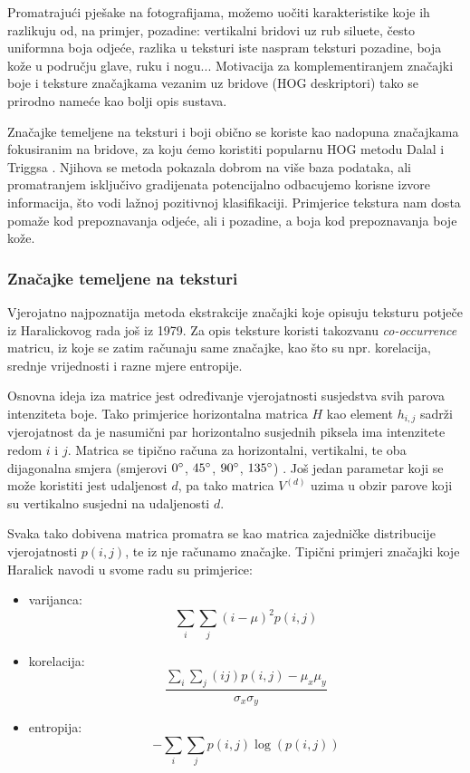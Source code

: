 \documentclass[seminar]{fer}
\begin{document}
Promatrajući pješake na fotografijama, možemo uočiti karakteristike koje ih razlikuju od, na primjer, pozadine: vertikalni bridovi uz rub siluete, često uniformna boja odjeće, razlika u teksturi iste naspram teksturi pozadine, boja kože u području glave, ruku i nogu...  Motivacija za komplementiranjem značajki boje i teksture značajkama vezanim uz bridove (HOG deskriptori) tako se prirodno nameće kao bolji opis sustava. 

Značajke temeljene na teksturi i boji obično se koriste kao nadopuna značajkama fokusiranim na bridove, za koju ćemo koristiti popularnu HOG
metodu Dalal i Triggsa \cite{HOG}. Njihova se metoda pokazala dobrom na više baza podataka, ali promatranjem isključivo gradijenata potencijalno odbacujemo
korisne izvore informacija, što vodi lažnoj pozitivnoj klasifikaciji. Primjerice tekstura nam dosta pomaže kod prepoznavanja odjeće, ali i pozadine, a boja kod prepoznavanja boje kože.

\subsubsection{Značajke temeljene na teksturi}
Vjerojatno najpoznatija metoda ekstrakcije značajki koje opisuju teksturu potječe iz Haralickovog rada \cite{Haralick} još iz 1979. Za opis teksture koristi takozvanu \emph{co-occurrence} matricu, iz koje se zatim računaju same značajke, kao što su npr. korelacija, srednje vrijednosti i razne mjere entropije.

Osnovna ideja iza matrice jest određivanje vjerojatnosti susjedstva svih parova intenziteta boje. Tako primjerice horizontalna matrica $H$ kao element
$h_{i,j}$ sadrži vjerojatnost da je nasumični par horizontalno susjednih piksela ima intenzitete redom $i$ i $j$. Matrica se tipično računa za horizontalni, vertikalni, te oba dijagonalna smjera (smjerovi $0\degree$, $45\degree$, $90\degree$, $135\degree$) . Još jedan parametar koji se može koristiti jest udaljenost $d$, pa tako matrica $V^{(d)}$ uzima u obzir 
parove koji su vertikalno susjedni na udaljenosti $d$.

Svaka tako dobivena matrica promatra se kao matrica zajedničke distribucije vjerojatnosti $p(i, j)$, te iz nje računamo značajke. Tipični primjeri značajki koje Haralick navodi u svome radu su primjerice:

\begin{itemize}
  \item
  varijanca: $$\sum_{i}\sum_{j}(i - \mu)^2p(i, j)$$
  \item
  korelacija: $$\frac{\sum_{i}\sum_{j}(ij)p(i,j) - \mu_{x}\mu_{y}}{\sigma_{x}\sigma_{y}}$$
  \item
  entropija: $$-\sum_{i}\sum_{j}p(i, j)\log(p(i, j))$$
\end{itemize}
\end{document}
